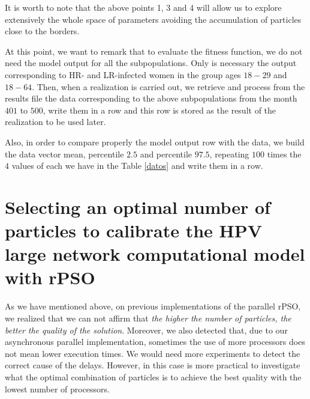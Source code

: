 It is worth to note that the above points 1, 3 and 4 will allow us to explore extensively the whole space of parameters avoiding the accumulation of particles close to the borders. 

\begin{remark}\label{mo}
At this point, we want to remark that to evaluate the fitness function, we do not need the model output for all the subpopulations. Only is necessary the output corresponding to HR- and LR-infected women in the group ages $18-29$ and $18-64$. Then, when a realization is carried out, we retrieve and process from the results file the data corresponding to the above subpopulations from the month $401$ to $500$, write them in a row and this row is stored as the result of the realization to be used later. 

Also, in order to compare properly the model output row with the data, we build the data vector mean, percentile $2.5$ and percentile $97.5$, repeating $100$ times the $4$ values of each we have in the Table \ref{datos} and write them in a row.
\end{remark}

\section{Selecting an optimal number of particles to calibrate the HPV large network computational model with rPSO}
As we have mentioned above, on previous implementations of the parallel rPSO, we realized that we can not affirm that \textit{the higher the number of particles, the better the quality of the solution}. Moreover, we also detected that, due to our asynchronous parallel implementation, sometimes the use of more processors does not mean lower execution times. We would need more experiments to detect the correct cause of the delays. However, in this case is more practical to investigate what the optimal combination of particles is to achieve the best quality with the lowest number of processors.

